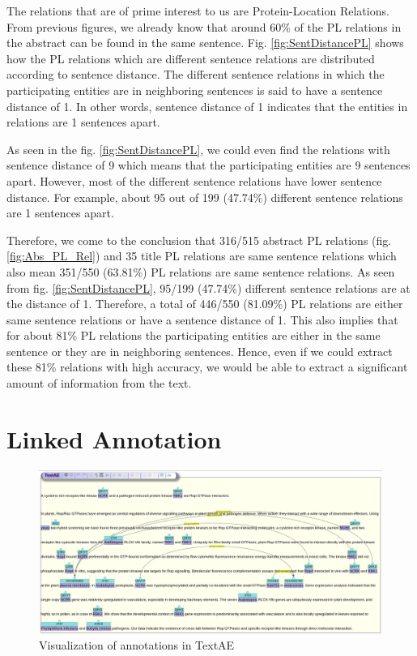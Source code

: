 The relations that are of prime interest to us are Protein-Location Relations. From previous figures, we already know that around 60\% of the PL relations in the abstract can be found in the same sentence. Fig. \ref{fig:SentDistancePL} shows how the PL relations which are different sentence relations are distributed according to sentence distance. The different sentence relations in which the participating entities are in neighboring sentences is said to have a sentence distance of 1. In other words, sentence distance of 1 indicates that the entities in relations are 1 sentences apart. 

As seen in the fig. \ref{fig:SentDistancePL}, we could even find the relations with sentence distance of 9 which means that the participating entities are 9 sentences apart. However, most of the different sentence relations have lower sentence distance. For example, about 95 out of 199 (47.74\%) different sentence relations are 1 sentences apart.


Therefore, we come to the conclusion that 316/515 abstract PL relations (fig. \ref{fig:Abs_PL_Rel}) and 35 title PL relations are same sentence relations which also mean 351/550 (63.81\%) PL relations are same sentence relations. As seen from  fig. \ref{fig:SentDistancePL}, 95/199 (47.74\%) different sentence relations are at the distance of 1. Therefore, a total of 446/550 (81.09\%) PL relations are either same sentence relations or have a sentence distance of 1. This also implies that for about 81\% PL relations the participating entities are either in the same sentence or they are in neighboring sentences. Hence, even if we could extract these 81\% relations with high accuracy, we would be able to extract a significant amount of information from the text.


\section{Linked Annotation}


\begin{figure}
\centering
\includegraphics[scale=0.25]{figures/TextAE_Vis.png}
\caption{Visualization of annotations in TextAE}\label{fig:TextAEVis}
\end{figure}


